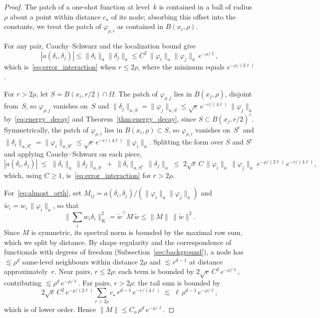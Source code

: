 \begin{proof}
The patch of a one-shot function at level~$k$ is contained in a ball of
radius $\rho$ about a point within distance $c_\star$ of its node;
absorbing this offset into the constants, we treat the patch of
$\varphi_{\rho,i}$ as contained in $B(x_i, \rho)$.

For any pair, Cauchy--Schwarz and the localization bound give
$$
|a(\delta_i,\delta_j)| \leq \|\delta_i\|_a\|\delta_j\|_a
 \leq C^2\,\|\varphi_i\|_a\|\varphi_j\|_a\,e^{-\rho/\ell},
$$
which is~\eqref{eq:error_interaction} when $r \leq 2\rho$, where the
minimum equals $e^{-\rho/(2\ell)}$.

For $r > 2\rho$, let $S = B(x_i, r/2) \cap \Omega$.  The patch of
$\varphi_{\rho,j}$ lies in $B(x_j, \rho)$, disjoint from~$S$, so
$\varphi_{\rho,j}$ vanishes on~$S$ and
$\|\delta_j\|_{a,S} = \|\varphi_j\|_{a,S}
 \leq \sqrt{e}\,e^{-r/(4\ell)}\,\|\varphi_j\|_a$
by~\eqref{eq:energy_decay} and Theorem~\ref{thm:energy_decay}, since
$S \subset B(x_j, r/2)^c$.  Symmetrically, the patch of
$\varphi_{\rho,i}$ lies in $B(x_i,\rho) \subset S$, so $\varphi_{\rho,i}$
vanishes on~$S^c$ and
$\|\delta_i\|_{a,S^c} = \|\varphi_i\|_{a,S^c}
 \leq \sqrt{e}\,e^{-r/(4\ell)}\,\|\varphi_i\|_a$.  Splitting the form
over $S$ and $S^c$ and applying Cauchy--Schwarz on each piece,
\[
  |a(\delta_i,\delta_j)|
  \;\leq\;
  \|\delta_i\|_a\,\|\delta_j\|_{a,S}
  \;+\;
  \|\delta_i\|_{a,S^c}\,\|\delta_j\|_a
  \;\leq\;
  2\sqrt{e}\,C\,\|\varphi_i\|_a\,\|\varphi_j\|_a\;
  e^{-\rho/(2\ell)}\,e^{-r/(4\ell)},
\]
which, using $C \geq 1$, is~\eqref{eq:error_interaction} for $r > 2\rho$.

For~\eqref{eq:almost_orth}, set
$M_{ij} = a(\delta_i,\delta_j)/(\|\varphi_i\|_a\|\varphi_j\|_a)$ and
$\widetilde{w}_i = w_i\,\|\varphi_i\|_a$, so that
$$\|\sum_i w_i\delta_i\|_K^2 = \widetilde{w}^\top M\,\widetilde{w}
 \leq \|M\|\,\|\widetilde{w}\|^2.$$
Since $M$ is symmetric, its spectral norm is bounded by the maximal row
sum, which we split by distance.  By shape regularity and the
correspondence of functionals with degrees of freedom
(Subsection~\ref{sec:background}), a node has $\lesssim \rho^d$
same-level neighbours within distance $2\rho$ and $\lesssim r^{d-1}$ at
distance approximately~$r$.  Near pairs, $r \leq 2\rho$: each term is
bounded by $2\sqrt{e}\,C^2\,e^{-\rho/\ell}$, contributing
$\lesssim \rho^d\,e^{-\rho/\ell}$.  Far pairs, $r > 2\rho$: the tail sum
is bounded by
\[
  2\sqrt{e}\,C^2\,e^{-\rho/(2\ell)}
  \sum_{r > 2\rho} c_\star\, r^{d-1}\,e^{-r/(4\ell)}
  \;\lesssim\;
  \ell\,\rho^{d-1}\,e^{-\rho/\ell},
\]
which is of lower order.  Hence
$\|M\| \leq C_{\mathrm{o}}\,\rho^d\,e^{-\rho/\ell}$.
\end{proof}

